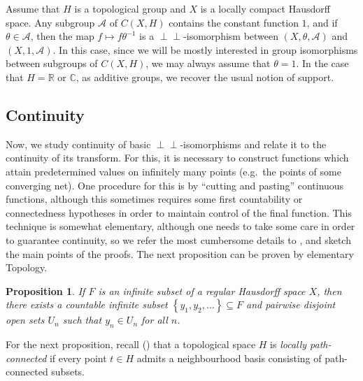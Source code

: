 \documentclass[letter,11pt]{amsart}
\theoremstyle{plain}		\newtheorem{theorem}[generalnumbering]{Theorem}
\theoremstyle{plain}		\newtheorem{corollary}[generalnumbering]{Corollary}
\theoremstyle{definition}		\newtheorem{definition}[generalnumbering]{Definition}
\theoremstyle{definition}		\newtheorem{example}[generalnumbering]{Example}
\theoremstyle{plain}		\newtheorem{proposition}[generalnumbering]{Proposition}
\theoremstyle{plain}		\newtheorem{lemma}[generalnumbering]{Lemma}
\theoremstyle{definition}
\newcommand{\perpp}{\perp\!\!\!\perp}
\begin{document}
Assume that $H$ is a topological group and $X$ is a locally compact Hausdorff space. Any subgroup $\mathcal{A}$ of $C(X,H)$ contains the constant function $1$, and if $\theta\in\mathcal{A}$, then the map $f\mapsto f\theta^{-1}$ is a $\perpp$-isomorphism between $(X,\theta,\mathcal{A})$ and $(X,1,\mathcal{A})$. In this case, since we will be mostly interested in group isomorphisms between subgroups of $C(X,H)$, we may always assume that $\theta=1$. In the case that $H=\mathbb{R}$ or $\mathbb{C}$, as additive groups, we recover the usual notion of support.

\subsection{Continuity}

Now, we study continuity of basic $\perpp$-isomorphisms and relate it to the continuity of its transform. For this, it is necessary to construct functions which attain predetermined values on infinitely many points (e.g.\ the points of some converging net). One procedure for this is by ``cutting and pasting'' continuous functions, although this sometimes requires some first countability or connectedness hypotheses in order to maintain control of the final function. This technique is somewhat elementary, although one needs to take some care in order to guarantee continuity, so we refer the most cumbersome details to \cite[Section 3.3.3]{cordeirothesis}, and sketch the main points of the proofs. The next proposition can be proven by elementary Topology.

\begin{proposition}\label{propositiondisjointopensets}
	If $F$ is an infinite subset of a regular Hausdorff space $X$, then there exists a countable infinite subset $\left\{y_1,y_2,\ldots\right\}\subseteq F$ and pairwise disjoint open sets $U_n$ such that $y_n\in U_n$ for all $n$.
\end{proposition}

For the next proposition, recall (\cite[27.4]{MR0264581}) that a topological space $H$ is \emph{locally path-connected} if every point $t\in H$ admits a neighbourhood basis consisting of path-connected subsets.
\end{document}

